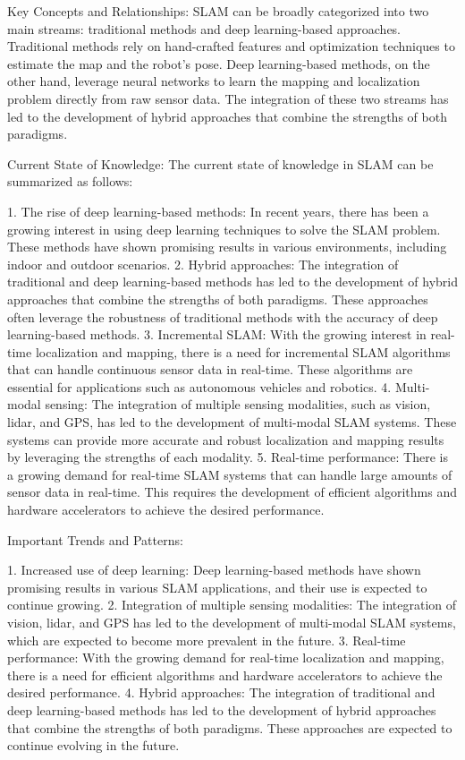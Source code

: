 \documentclass[conference]{IEEEtran}
\begin{document}
Key Concepts and Relationships:
SLAM can be broadly categorized into two main streams: traditional methods and deep learning-based approaches. Traditional methods rely on hand-crafted features and optimization techniques to estimate the map and the robot's pose. Deep learning-based methods, on the other hand, leverage neural networks to learn the mapping and localization problem directly from raw sensor data. The integration of these two streams has led to the development of hybrid approaches that combine the strengths of both paradigms.

Current State of Knowledge:
The current state of knowledge in SLAM can be summarized as follows:

1. The rise of deep learning-based methods: In recent years, there has been a growing interest in using deep learning techniques to solve the SLAM problem. These methods have shown promising results in various environments, including indoor and outdoor scenarios.
2. Hybrid approaches: The integration of traditional and deep learning-based methods has led to the development of hybrid approaches that combine the strengths of both paradigms. These approaches often leverage the robustness of traditional methods with the accuracy of deep learning-based methods.
3. Incremental SLAM: With the growing interest in real-time localization and mapping, there is a need for incremental SLAM algorithms that can handle continuous sensor data in real-time. These algorithms are essential for applications such as autonomous vehicles and robotics.
4. Multi-modal sensing: The integration of multiple sensing modalities, such as vision, lidar, and GPS, has led to the development of multi-modal SLAM systems. These systems can provide more accurate and robust localization and mapping results by leveraging the strengths of each modality.
5. Real-time performance: There is a growing demand for real-time SLAM systems that can handle large amounts of sensor data in real-time. This requires the development of efficient algorithms and hardware accelerators to achieve the desired performance.

Important Trends and Patterns:

1. Increased use of deep learning: Deep learning-based methods have shown promising results in various SLAM applications, and their use is expected to continue growing.
2. Integration of multiple sensing modalities: The integration of vision, lidar, and GPS has led to the development of multi-modal SLAM systems, which are expected to become more prevalent in the future.
3. Real-time performance: With the growing demand for real-time localization and mapping, there is a need for efficient algorithms and hardware accelerators to achieve the desired performance.
4. Hybrid approaches: The integration of traditional and deep learning-based methods has led to the development of hybrid approaches that combine the strengths of both paradigms. These approaches are expected to continue evolving in the future.
\end{document}
